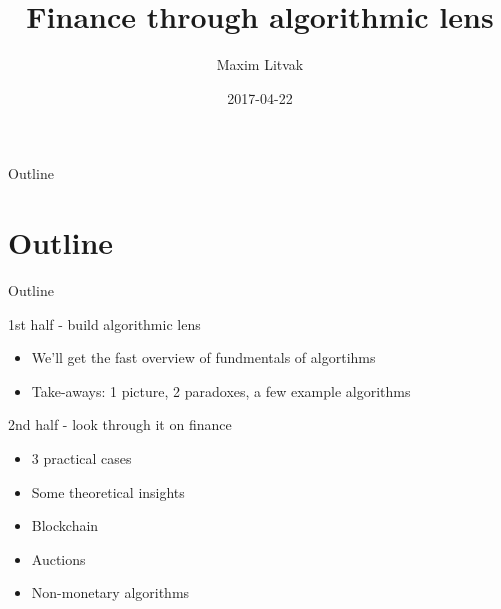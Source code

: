 \documentclass[presentation]{beamer}
\author{Maxim Litvak}
\date{2017-04-22}
\title{Finance through algorithmic lens}
\begin{document}
\maketitle
\begin{frame}{Outline}
\tableofcontents
\end{frame}

\section{Outline}
\label{sec-1}
\begin{frame}[label=sec-1-1]{Outline}
\begin{block}{1st half - build algorithmic lens}
\begin{itemize}
\item We'll get the fast overview of fundmentals of algortihms
\item Take-aways: 1 picture, 2 paradoxes, a few example algorithms
\end{itemize}
\end{block}
\begin{block}{2nd half - look through it on finance}
\begin{itemize}
\item 3 practical cases
\item Some theoretical insights
\item Blockchain
\item Auctions
\item Non-monetary algorithms
\end{itemize}
\end{block}
\end{frame}
\end{document}
